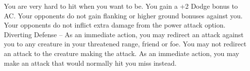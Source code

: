 \combatfeat
{You are very hard to hit when you want to be.}
{You gain a +2 Dodge bonus to AC.}
{Your opponents do not gain flanking or higher ground bonuses against you.}
{Your opponents do not inflict extra damage from the power attack option.}
{Diverting Defense -- As an immediate action, you may redirect an attack against you to any creature in your threatened range, friend or foe. You may not redirect an attack to the creature making the attack.}
{As an immediate action, you may make an attack that would normally hit you miss instead.}